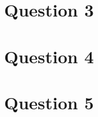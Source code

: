 \documentclass{article}
\begin{document}
\pagebreak
\section{Question 3}





\pagebreak
\section{Question 4}




\pagebreak
\section{Question 5}
\end{document}
